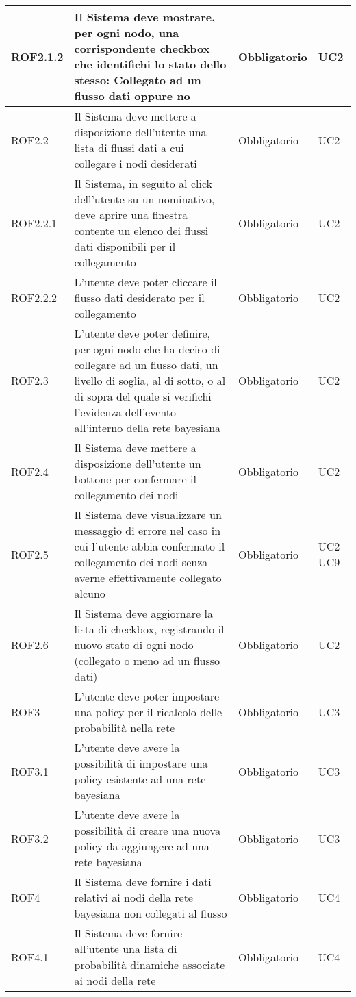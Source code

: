 \begin{center}
\begin{longtable}[c]{|m{}|m{}|m{}|m{}|}
\hline
ROF2.1.2 & Il Sistema deve mostrare, per ogni nodo, una corrispondente checkbox che identifichi lo stato dello stesso: Collegato ad un flusso dati oppure no & Obbligatorio & UC2\\
\hline
\rowcolor{grigio}ROF2.2 & Il Sistema deve mettere a disposizione dell'utente una lista di flussi dati a cui collegare i nodi desiderati & Obbligatorio & UC2\\
\hline
ROF2.2.1 & Il Sistema, in seguito al click dell'utente su un nominativo, deve aprire una finestra contente un elenco dei flussi dati disponibili per il collegamento & Obbligatorio & UC2\\
\hline
\rowcolor{grigio}ROF2.2.2 & L'utente deve poter cliccare il flusso dati desiderato per il collegamento & Obbligatorio & UC2\\
\hline
ROF2.3 & L'utente deve poter definire, per ogni nodo che ha deciso di collegare ad un flusso dati, un livello di soglia, al di sotto, o al di sopra del quale si verifichi l'evidenza dell'evento all'interno della rete bayesiana & Obbligatorio & UC2\\
\hline
\rowcolor{grigio}ROF2.4 & Il Sistema deve mettere a disposizione dell'utente un bottone per confermare il collegamento dei nodi & Obbligatorio & UC2\\
\hline
ROF2.5 & Il Sistema deve visualizzare un messaggio di errore nel caso in cui l'utente abbia confermato il collegamento dei nodi senza averne effettivamente collegato alcuno & Obbligatorio & UC2 UC9\\
\hline
\rowcolor{grigio}ROF2.6 & Il Sistema deve aggiornare la lista di checkbox, registrando il nuovo stato di ogni nodo (collegato o meno ad un flusso dati) & Obbligatorio & UC2\\
\hline
ROF3 & L'utente deve poter impostare una policy per il ricalcolo delle probabilità nella rete & Obbligatorio & UC3\\
\hline
\rowcolor{grigio}ROF3.1 & L'utente deve avere la possibilità di impostare una policy esistente ad una rete bayesiana  & Obbligatorio & UC3\\ 
\hline
ROF3.2 & L'utente deve avere la possibilità di creare una nuova policy da aggiungere ad una rete bayesiana & Obbligatorio & UC3\\
\hline
\rowcolor{grigio}ROF4 & Il Sistema deve fornire i dati relativi ai nodi della rete bayesiana non collegati al flusso & Obbligatorio & UC4\\
\hline
ROF4.1 & Il Sistema deve fornire all'utente una lista di probabilità dinamiche associate ai nodi della rete & Obbligatorio & UC4\\

\end{longtable}
\end{center}
